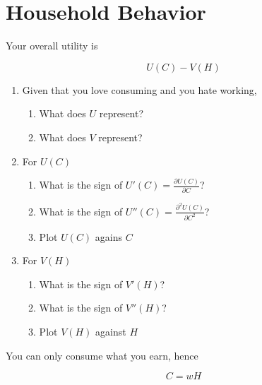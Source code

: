\documentclass[11pt]{scrartcl}
\begin{document}
\section{Household Behavior}

Your overall utility is 

\[U(C) - V(H)\]

\begin{enumerate}
\item Given that you love consuming and you hate working,
\begin{enumerate}
\item What does $U$ represent?
\item What does $V$ represent?
\end{enumerate}
\item For $U(C)$
\begin{enumerate}
\item What is the sign of $U'(C) = \frac{\partial U(C)}{\partial C}$?
\item What is the sign of $U''(C) = \frac{\partial^2 U(C)}{\partial C^2}$?
\item Plot $U(C)$ agains $C$
\end{enumerate}
\item For $V(H)$
\begin{enumerate}
\item What is the sign of $V'(H)$?
\item What is the sign of $V''(H)$?
\item Plot $V(H)$ against $H$
\end{enumerate}
\end{enumerate}

You can only consume what you earn, hence

\[ C = wH\]
\end{document}
